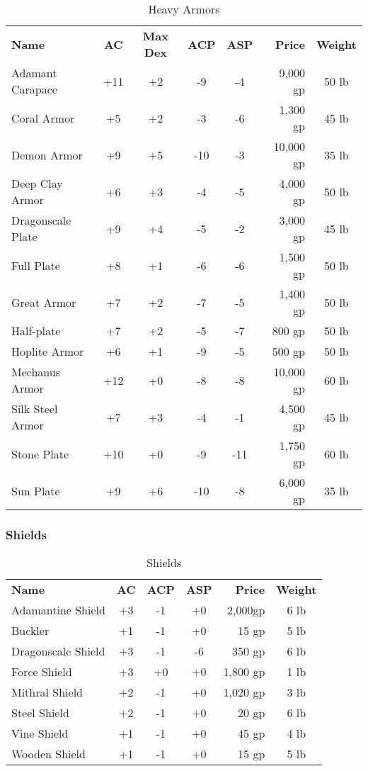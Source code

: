 \begin{table}[htb]
\caption{Heavy Armors}
\centering
\begin{tabular}{l *{4}{c} r c}
\textbf{Name} & \textbf{AC} & \textbf{Max Dex} & \textbf{ACP} & \textbf{ASP} & \textbf{Price} & \textbf{Weight}\\
Adamant Carapace & +11 & +2 & -9 & -4 & 9,000 gp & 50 lb\\
Coral Armor & +5 & +2 & -3 & -6 & 1,300 gp & 45 lb\\
Demon Armor & +9 & +5 & -10 & -3 & 10,000 gp & 35 lb\\
Deep Clay Armor & +6 & +3 & -4 & -5 & 4,000 gp & 50 lb\\
Dragonscale Plate & +9 & +4 & -5 & -2 & 3,000 gp & 45 lb\\
Full Plate & +8 & +1 & -6 & -6 & 1,500 gp & 50 lb\\
Great Armor & +7 & +2 & -7 & -5 & 1,400 gp & 50 lb\\
Half-plate & +7 & +2 & -5 & -7 & 800 gp & 50 lb\\
Hoplite Armor & +6 & +1 & -9 & -5 & 500 gp & 50 lb\\
Mechanus Armor & +12 & +0 & -8 & -8 & 10,000 gp & 60 lb\\
Silk Steel Armor & +7 & +3 & -4 & -1 & 4,500 gp & 45 lb\\
Stone Plate & +10 & +0 & -9 & -11 & 1,750 gp & 60 lb\\
Sun Plate & +9 & +6 & -10 & -8 & 6,000 gp & 35 lb\\
\end{tabular}
\end{table}


\subsubsection{Shields}

\begin{table}[htb]
\caption{Shields}
\centering
\begin{tabular}{l *{3}{c} r c}
\textbf{Name} & \textbf{AC} & \textbf{ACP} & \textbf{ASP} & \textbf{Price} & \textbf{Weight}\\
Adamantine Shield & +3 & -1 & +0 & 2,000gp & 6 lb\\
Buckler & +1 & -1 & +0 & 15 gp & 5 lb\\
Dragonscale Shield & +3 & -1 & -6 & 350 gp & 6 lb\\
Force Shield & +3 & +0 & +0 & 1,800 gp & 1 lb\\
Mithral Shield & +2 & -1 & +0 & 1,020 gp & 3 lb\\
Steel Shield & +2 & -1 & +0 & 20 gp & 6 lb\\
Vine Shield & +1 & -1 & +0 & 45 gp & 4 lb\\
Wooden Shield & +1 & -1 & +0 & 15 gp & 5 lb\\
\end{tabular}
\end{table}


